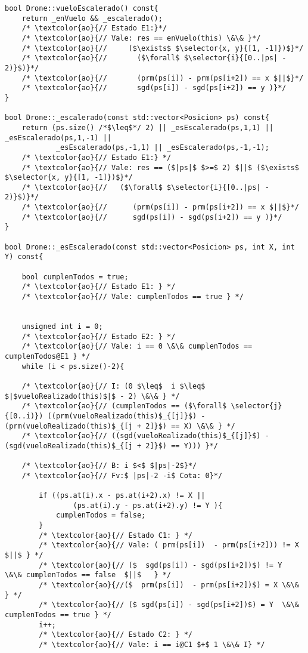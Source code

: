 \begin{lstlisting}
bool Drone::vueloEscalerado() const{
    return _enVuelo && _escalerado();
    /* \textcolor{ao}{// Estado E1:}*/
    /* \textcolor{ao}{// Vale: res == enVuelo(this) \&\& }*/
    /* \textcolor{ao}{//     ($\exists$ $\selector{x, y}{[1, -1]})$}*/
    /* \textcolor{ao}{//       ($\forall$ $\selector{i}{[0..|ps| - 2)}$)}*/
    /* \textcolor{ao}{//       (prm(ps[i]) - prm(ps[i+2]) == x $||$}*/
    /* \textcolor{ao}{//       sgd(ps[i]) - sgd(ps[i+2]) == y )}*/
}

bool Drone::_escalerado(const std::vector<Posicion> ps) const{
    return (ps.size() /*$\leq$*/ 2) || _esEscalerado(ps,1,1) || _esEscalerado(ps,1,-1) ||
            _esEscalerado(ps,-1,1) || _esEscalerado(ps,-1,-1);
    /* \textcolor{ao}{// Estado E1:} */
    /* \textcolor{ao}{// Vale: res == ($|ps|$ $>=$ 2) $||$ ($\exists$ $\selector{x, y}{[1, -1]})$}*/
    /* \textcolor{ao}{//   ($\forall$ $\selector{i}{[0..|ps| - 2)}$)}*/
    /* \textcolor{ao}{//      (prm(ps[i]) - prm(ps[i+2]) == x $||$}*/
    /* \textcolor{ao}{//      sgd(ps[i]) - sgd(ps[i+2]) == y )}*/
}

bool Drone::_esEscalerado(const std::vector<Posicion> ps, int X, int Y) const{

    bool cumplenTodos = true;
    /* \textcolor{ao}{// Estado E1: } */
    /* \textcolor{ao}{// Vale: cumplenTodos == true } */


    unsigned int i = 0;
    /* \textcolor{ao}{// Estado E2: } */
    /* \textcolor{ao}{// Vale: i == 0 \&\& cumplenTodos == cumplenTodos@E1 } */
    while (i < ps.size()-2){
    
    /* \textcolor{ao}{// I: (0 $\leq$  i $\leq$ $|$vueloRealizado(this)$|$ - 2) \&\& } */
    /* \textcolor{ao}{// (cumplenTodos == ($\forall$ \selector{j}{[0..i)}) ((prm(vueloRealizado(this)$_{[j]}$) - (prm(vueloRealizado(this)$_{[j + 2]}$) == X) \&\& } */ 
    /* \textcolor{ao}{// ((sgd(vueloRealizado(this)$_{[j]}$) - (sgd(vueloRealizado(this)$_{[j + 2]}$) == Y))) }*/
     
    /* \textcolor{ao}{// B: i $<$ $|ps|-2$}*/
    /* \textcolor{ao}{// Fv:$ |ps|-2 -i$ Cota: 0}*/

        if ((ps.at(i).x - ps.at(i+2).x) != X ||
                (ps.at(i).y - ps.at(i+2).y) != Y ){
            cumplenTodos = false;
        }
        /* \textcolor{ao}{// Estado C1: } */
        /* \textcolor{ao}{// Vale: ( prm(ps[i])  - prm(ps[i+2])) != X $||$ } */ 
        /* \textcolor{ao}{// ($  sgd(ps[i]) - sgd(ps[i+2])$) != Y  \&\& cumplenTodos == false  $||$   } */ 
        /* \textcolor{ao}{//($  prm(ps[i])  - prm(ps[i+2])$) = X \&\& } */ 
        /* \textcolor{ao}{// ($ sgd(ps[i]) - sgd(ps[i+2])$) = Y  \&\& cumplenTodos == true } */
        i++;
        /* \textcolor{ao}{// Estado C2: } */
        /* \textcolor{ao}{// Vale: i == i@C1 $+$ 1 \&\& I} */


\end{lstlisting}
